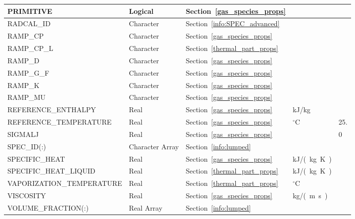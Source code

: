 \documentclass[11pt]{book}
\begin{document}
\begin{longtable}{@{\extracolsep{\fill}}|l|l|l|l|l|}
{\ct PRIMITIVE}                     & Logical     & Section~\ref{gas_species_props}         &                   &               \\ \hline
{\ct RADCAL\_ID}                    & Character   & Section~\ref{info:SPEC_advanced}        &                   &               \\ \hline
{\ct RAMP\_CP}                      & Character   & Section~\ref{gas_species_props}         &                   &               \\ \hline
{\ct RAMP\_CP\_L}                   & Character   & Section~\ref{thermal_part_props}        &                   &               \\ \hline
{\ct RAMP\_D}                       & Character   & Section~\ref{gas_species_props}         &                   &               \\ \hline
{\ct RAMP\_G\_F}                    & Character   & Section~\ref{gas_species_props}         &                   &               \\ \hline
{\ct RAMP\_K}                       & Character   & Section~\ref{gas_species_props}         &                   &               \\ \hline
{\ct RAMP\_MU}                      & Character   & Section~\ref{gas_species_props}         &                   &               \\ \hline
{\ct REFERENCE\_ENTHALPY}           & Real        & Section~\ref{gas_species_props}         & kJ/kg             &               \\ \hline
{\ct REFERENCE\_TEMPERATURE}        & Real        & Section~\ref{gas_species_props}         & $^\circ$C         & 25.           \\ \hline
{\ct SIGMALJ}                       & Real        & Section~\ref{gas_species_props}         &                   & 0             \\ \hline
{\ct SPEC\_ID(:)}                   & Character Array   & Section~\ref{info:lumped}             &                   &               \\ \hline
{\ct SPECIFIC\_HEAT}                & Real        & Section~\ref{gas_species_props}         & \si{kJ/(kg.K)}    &               \\ \hline
{\ct SPECIFIC\_HEAT\_LIQUID}        & Real        & Section~\ref{thermal_part_props}        & \si{kJ/(kg.K)}    &               \\ \hline
{\ct VAPORIZATION\_TEMPERATURE}     & Real        & Section~\ref{thermal_part_props}        & $^\circ$C         &               \\ \hline
{\ct VISCOSITY}                     & Real        & Section~\ref{gas_species_props}         & \si{kg/(m.s)}     &               \\ \hline
{\ct VOLUME\_FRACTION(:)}           & Real Array        & Section~\ref{info:lumped}             &                   &               \\ \hline
\end{longtable}
\end{document}
